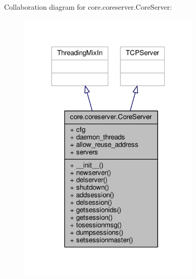 Collaboration diagram for core.\+coreserver.\+Core\+Server\+:
\nopagebreak
\begin{figure}[H]
\begin{center}
\leavevmode
\includegraphics[width=246pt]{classcore_1_1coreserver_1_1_core_server__coll__graph}
\end{center}
\end{figure}
